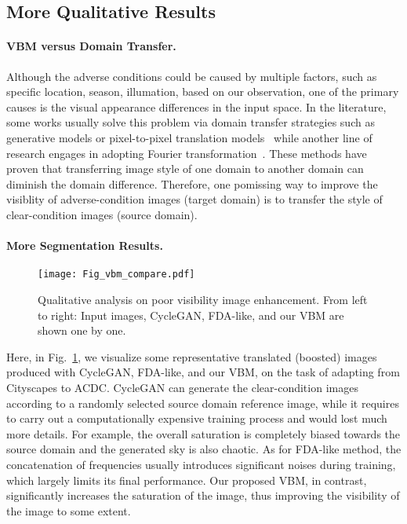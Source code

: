 \documentclass[letterpaper]{article} \usepackage{aaai23}  \usepackage{times}  \usepackage{helvet}  \usepackage{courier}  \usepackage[hyphens]{url}  \usepackage{graphicx} \urlstyle{rm} \def\UrlFont{\rm}  \usepackage{natbib}  \usepackage{caption} \frenchspacing  \setlength{\pdfpagewidth}{8.5in}  \setlength{\pdfpageheight}{11in}  \usepackage{algorithm}
\begin{document}
\subsection{More Qualitative Results}
\label{sec:more_qualitative}

\paragraph{VBM versus Domain Transfer.} Although the adverse conditions could be caused by multiple factors, such as specific location, season, illumation, based on our observation, one of the primary causes is the visual appearance differences in the input space. In the literature, some works usually solve this problem via domain transfer strategies such as generative models or pixel-to-pixel translation models~\cite{hoffman2018cycada,li2019bidirectional} while another line of research engages in adopting Fourier transformation~\cite{yang2020fda}. These methods have proven that transferring image style of one domain to another domain can diminish the domain difference. Therefore, one pomissing way to improve the visiblity of adverse-condition images (target domain) is to transfer the style of clear-condition images (source domain).

\paragraph{More Segmentation Results.} 

\begin{figure}[H]
  \centering
  \texttt{[image: Fig\_vbm\_compare.pdf]}
  \caption[p]{Qualitative analysis on poor visibility image enhancement. From left to right: Input images, CycleGAN, FDA-like, and our VBM are shown one by one.}
  \label{fig:vbm_compare}
\end{figure}

Here, in Fig.~\ref{fig:vbm_compare}, we visualize some representative translated (boosted) images produced with CycleGAN, FDA-like, and our VBM, on the task of adapting from Cityscapes to ACDC. CycleGAN can generate the clear-condition images according to a randomly selected source domain reference image, while it requires to carry out a computationally expensive training process and would lost much more details. For example, the overall saturation is completely biased towards the source domain and the generated sky is also chaotic. As for FDA-like method, the concatenation of frequencies usually introduces significant noises during training, which largely limits its final performance. Our proposed VBM, in contrast, significantly increases the saturation of the image, thus improving the visibility of the image to some extent.
\end{document}
